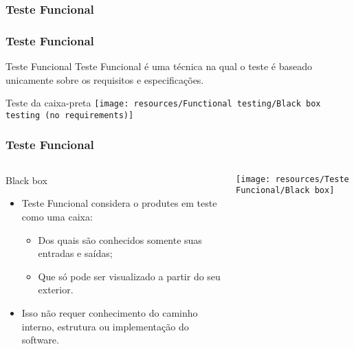 \begin{frame}[c,parent={cmap:software-testing}, hasprev=false, hasnext=false]
\frametitle{Teste Funcional}
\label{cmap:functional-testing}

\end{frame}



\begin{frame}[parent={cmap:functional-testing}, hasprev=false, hasnext=true]
\frametitle{Teste Funcional}
\label{concept:functional-testing}

\begin{block:concept}{Teste Funcional}
Teste Funcional é uma técnica na qual o teste é baseado unicamente sobre os
requisitos e especificações.
\end{block:concept}

\begin{block:fact}{Teste da caixa-preta}
	\centering
	\texttt{[image: resources/Functional testing/Black box testing (no requirements)]}
\end{block:fact}
\end{frame}


\begin{frame}[hasprev=true, hasnext=true]
\frametitle{Teste Funcional}
\label{concept:black-box}

\begin{columns}[t]
\begin{block:fact}{Black box}
\begin{itemize}
	\item Teste Funcional considera o produtes em teste como uma caixa:
	\begin{itemize}
		\item Dos quais são conhecidos somente suas entradas e saídas;

		\item Que só pode ser visualizado a partir do seu exterior.
	\end{itemize}

	\item Isso não requer conhecimento do caminho interno, estrutura ou 
	implementação do software.
\end{itemize}
\end{block:fact}

\texttt{[image: resources/Teste Funcional/Black box]}
\end{columns}
\end{frame}



